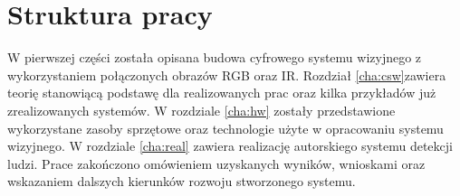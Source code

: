 \section{Struktura pracy}

W pierwszej części została opisana budowa cyfrowego systemu wizyjnego z wykorzystaniem połączonych obrazów RGB oraz IR. 
Rozdział \ref{cha:csw}zawiera teorię stanowiącą podstawę dla realizowanych prac oraz kilka 
przykładów już zrealizowanych systemów. 
W rozdziale \ref{cha:hw} zostały przedstawione wykorzystane zasoby sprzętowe oraz technologie użyte w opracowaniu systemu wizyjnego.
W rozdziale \ref{cha:real} zawiera realizację autorskiego systemu detekcji ludzi. 
Prace zakończono omówieniem uzyskanych wyników, wnioskami oraz wskazaniem dalszych kierunków rozwoju stworzonego systemu.
